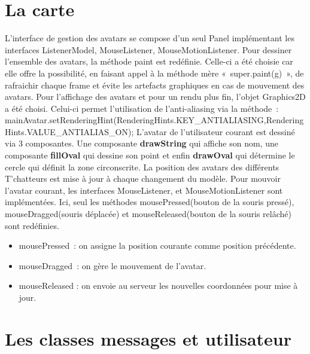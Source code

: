 \documentclass[a4paper,12pt]{report}
\begin{document}
    \section{La carte}
    L’interface de gestion des avatars se compose d’un seul Panel implémentant les interfaces ListenerModel, MouseListener, MouseMotionListener.
    \medbreak
    Pour dessiner l’ensemble des avatars, la méthode paint est redéfinie. Celle-ci a été choisie car elle offre la possibilité, en faisant appel à la méthode mère « super.paint(g) », de rafraichir chaque frame et évite les artefacts graphiques en cas de mouvement des avatars.
    \medbreak
    Pour l’affichage des avatars et pour un rendu plus fin, l’objet Graphics2D a été choisi. Celui-ci permet l’utilisation de l’anti-aliasing via la méthode : mainAvatar.setRenderingHint(RenderingHints.KEY\_ANTIALIASING,RenderingHints.VALUE\_ANTIALIAS\_ON);
    \medbreak
    L’avatar de l’utilisateur courant est dessiné via 3 composantes. Une composante \textbf{drawString} qui affiche son nom, une composante \textbf{fillOval} qui dessine son point et enfin \textbf{drawOval} qui détermine le cercle qui définit la zone circonscrite.
    \medbreak
    La position des avatars des différents T’chatteurs est mise à jour à chaque changement du modèle.
    \medbreak
    Pour mouvoir l’avatar courant, les interfaces MouseListener, et MouseMotionListener sont implémentées.
    \medbreak
    Ici, seul les méthodes mousePressed(bouton de la souris pressé), mouseDragged(souris déplacée) et mouseReleased(bouton de la souris relâché) sont redéfinies.
    \bigbreak
    \begin{itemize}
      \item mousePressed : on assigne la position courante comme position précédente.
      \item mouseDragged : on gère le mouvement de l’avatar.
      \item mouseReleased : on envoie au serveur les nouvelles coordonnées pour mise à jour.
    \end{itemize}

    \section{Les classes messages et utilisateur}
\end{document}
